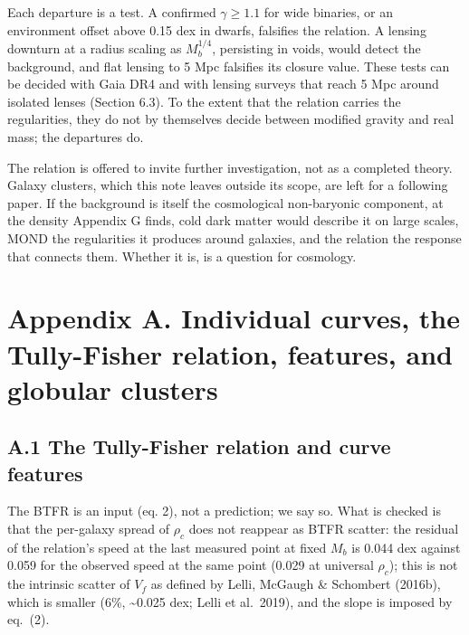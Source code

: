 \documentclass[
  10pt,
]{article}
\begin{document}
Each departure is a test. A confirmed $\gamma\ge1.1$ for wide binaries, or an environment offset above 0.15 dex in dwarfs, falsifies the relation. A lensing downturn at a radius scaling as $M_b^{1/4}$, persisting in voids, would detect the background, and flat lensing to 5 Mpc falsifies its closure value. These tests can be decided with Gaia DR4 and with lensing surveys that reach 5 Mpc around isolated lenses (Section 6.3). To the extent that the relation carries the regularities, they do not by themselves decide between modified gravity and real mass; the departures do.

The relation is offered to invite further investigation, not as a completed theory. Galaxy clusters, which this note leaves outside its scope, are left for a following paper. If the background is itself the cosmological non-baryonic component, at the density Appendix G finds, cold dark matter would describe it on large scales, MOND the regularities it produces around galaxies, and the relation the response that connects them. Whether it is, is a question for cosmology.

\section{Appendix A. Individual curves, the Tully-Fisher relation, features, and globular clusters}\label{appendix-a.-individual-curves-the-tully-fisher-relation-features-and-globular-clusters}

\subsection{A.1 The Tully-Fisher relation and curve features}\label{the-tully-fisher-relation-and-curve-features}

The BTFR is an input (eq. 2), not a prediction; we say so. What is checked is that the per-galaxy spread of $\rho_c$ does not reappear as BTFR scatter: the residual of the relation's speed at the last measured point at fixed $M_b$ is 0.044 dex against 0.059 for the observed speed at the same point (0.029 at universal $\rho_c$); this is not the intrinsic scatter of $V_f$ as defined by Lelli, McGaugh \& Schombert (2016b), which is smaller (6\%, \textasciitilde{}0.025 dex; Lelli et al.~2019), and the slope is imposed by eq.~(2).
\end{document}
